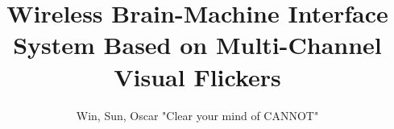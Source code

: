 \documentclass[a4paper,12pt,twoside]{report}
\begin{document}
\title{\LARGE {\bf Wireless Brain-Machine Interface System Based on Multi-Channel Visual Flickers}\\
 \vspace*{6mm}
}

\author{Win, Sun, Oscar "Clear your mind of CANNOT"}

\normallinespacing
\maketitle

\preface


%
%

\body






\appendix




\end{document}

